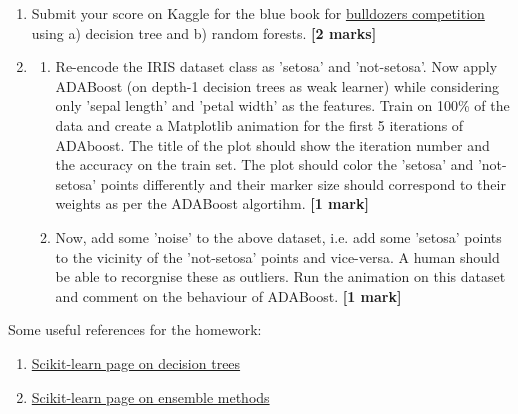 \documentclass[colorlinks]{article}
\begin{document}
\begin{enumerate}
	\item Submit your score on Kaggle for the blue book for \href{https://www.kaggle.com/c/bluebook-for-bulldozers}{bulldozers competition} using a) decision tree and b) random forests.
\textbf{[2 marks]}

\item \begin{enumerate}
	\item Re-encode the IRIS dataset class as 'setosa' and 'not-setosa'. Now apply ADABoost (on depth-1 decision trees as weak learner) while considering only 'sepal length' and 'petal width' as the features. Train on 100\% of the data and create a Matplotlib animation for the first 5 iterations of ADAboost. The title of the plot should show the iteration number and the accuracy on the train set. The plot should color the 'setosa' and 'not-setosa' points differently and their marker size should correspond to their weights as per the ADABoost algortihm. \textbf{[1 mark]}
	\item Now, add some 'noise' to the above dataset, i.e. add some 'setosa' points to the vicinity of the 'not-setosa' points and vice-versa. A human should be able to recorgnise these as outliers. Run the animation on this dataset and comment on the behaviour of ADABoost. \textbf{[1 mark]}
\end{enumerate}


	
	
	

\end{enumerate}


Some useful references for the homework:

\begin{enumerate}
	\item \href{https://scikit-learn.org/stable/modules/tree.html}{Scikit-learn page on decision trees}
		\item \href{https://scikit-learn.org/stable/modules/ensemble.html}{Scikit-learn page on ensemble methods}
\end{enumerate}
\end{document}
